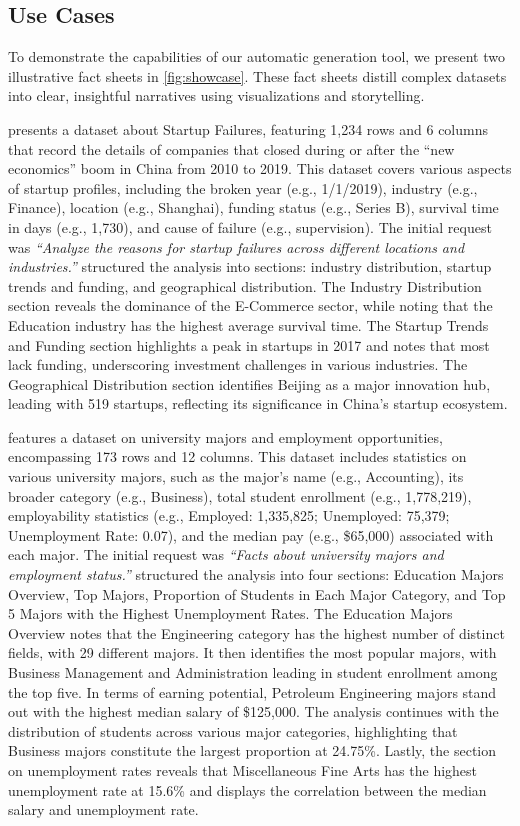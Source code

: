 \subsection{Use Cases}

To demonstrate the capabilities of our automatic generation tool, we present two illustrative fact sheets in \cref{fig:showcase}. These fact sheets distill complex datasets into clear, insightful narratives using visualizations and storytelling.

 presents a dataset about Startup Failures, featuring 1,234 rows and 6 columns that record the details of companies that closed during or after the ``new economics'' boom in China from 2010 to 2019. This dataset covers various aspects of startup profiles, including the broken year (e.g., 1/1/2019), industry (e.g., Finance), location (e.g., Shanghai), funding status (e.g., Series B), survival time in days (e.g., 1,730), and cause of failure (e.g., supervision). The initial request was \emph{``Analyze the reasons for startup failures across different locations and industries.''} \tool structured the analysis into sections: industry distribution, startup trends and funding, and geographical distribution. The Industry Distribution section reveals the dominance of the E-Commerce sector, while noting that the Education industry has the highest average survival time. The Startup Trends and Funding section highlights a peak in startups in 2017 and notes that most lack funding, underscoring investment challenges in various industries.  The Geographical Distribution section identifies Beijing as a major innovation hub, leading with 519 startups, reflecting its significance in China's startup ecosystem. 

 features a dataset on university majors and employment opportunities, encompassing 173 rows and 12 columns. This dataset includes statistics on various university majors, such as the major's name (e.g., Accounting), its broader category (e.g., Business), total student enrollment (e.g., 1,778,219), employability statistics (e.g., Employed: 1,335,825; Unemployed: 75,379; Unemployment Rate: 0.07), and the median pay (e.g., \$65,000) associated with each major. The initial request was \emph{``Facts about university majors and employment status.''} \tool structured the analysis into four sections: Education Majors Overview, Top Majors, Proportion of Students in Each Major Category, and Top 5 Majors with the Highest Unemployment Rates. The Education Majors Overview notes that the Engineering category has the highest number of distinct fields, with 29 different majors. It then identifies the most popular majors, with Business Management and Administration leading in student enrollment among the top five. In terms of earning potential, Petroleum Engineering majors stand out with the highest median salary of \$125,000. The analysis continues with the distribution of students across various major categories, highlighting that Business majors constitute the largest proportion at 24.75\%. Lastly, the section on unemployment rates reveals that Miscellaneous Fine Arts has the highest unemployment rate at 15.6\% and displays the correlation between the median salary and unemployment rate. 

